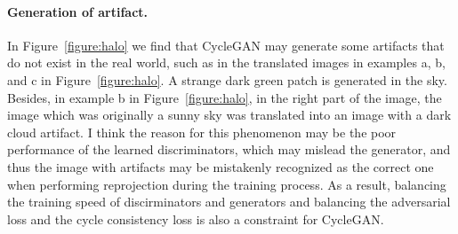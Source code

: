\paragraph{Generation of artifact.} In Figure~\ref{figure:halo} we find that CycleGAN may generate some artifacts that do not exist in the real world, such as in the translated images in examples a, b, and c in Figure~\ref{figure:halo}. A strange dark green patch is generated in the sky. Besides, in example b in Figure~\ref{figure:halo}, in the right part of the image, the image which was originally a sunny sky was translated into an image with a dark cloud artifact. I think the reason for this phenomenon may be the poor performance of the learned discriminators, which may mislead the generator, and thus the image with artifacts may be mistakenly recognized as the correct one when performing reprojection during the training process. As a result, balancing the training speed of discirminators and generators and balancing the adversarial loss and the cycle consistency loss is also a constraint for CycleGAN.\@

